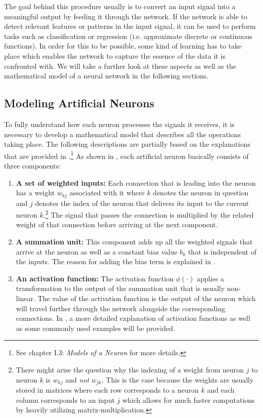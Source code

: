 The goal behind this procedure usually is to convert an input signal
into a meaningful output by feeding it through the network. If the
network is able to detect relevant features or patterns in the input
signal, it can be used to perform tasks such as classification or
regression (i.e. approximate discrete or continuous functions).
In order for this to be possible, some kind of learning has to take
place which enables the network to capture the essence of the data it
is confronted with. We will take a further look at these aspects as
well as the mathematical model of a neural network in the following
sections.

\subsection{Modeling Artificial Neurons}
\label{sec:artificial-neurons}
To fully understand how each neuron processes the signals it receives,
it is necessary to develop a mathematical model that describes all the
operations taking place. The following descriptions are partially
based on the explanations that are provided in \cite{Haykin}.\footnote{See
  chapter I.3: \textit{Models of a Neuron} for more details.}
As shown in , each artificial neuron
basically consists of three components:
\begin{enumerate}
  \item \textbf{A set of weighted inputs:} Each connection that is
    leading into the neuron has a weight \(w_{kj}\) associated with it
    where \(k\) denotes the neuron in question and \(j\) denotes the
    index of the neuron that delivers its input to the current neuron
    \(k\).\footnote{There might arise the question why the indexing of
    a weight from neuron \(j\) to neuron \(k\) is \(w_{kj}\) and
    \textit{not} \(w_{jk}\). This is the case because the weights are
    usually stored in matrices where each row corresponds to a
    neuron \(k\) and each column corresponds to an input \(j\) which
    allows for much faster computations by heavily utilizing
    matrix-multiplication.} The signal that
    passes the connection is multiplied by the
    related weight of that connection before arriving at the next
    component.
  \item \textbf{A summation unit:} This component adds up all the
    weighted signals that arrive at the neuron as well as a constant
    bias value
    \(b_k\) that is independent of the inputs. The reason for adding
    the bias term is explained in .
  \item \textbf{An activation function:} The activation function
    \(\phi(\cdot)\) applies a transformation to the output of the
    summation unit that is usually non-linear. The value of
    the activation function is the output of the neuron which will
    travel further through the network alongside the corresponding
    connections. In , a more
    detailed explanation of activation functions as well as some
    commonly used examples will be provided.
\end{enumerate}
